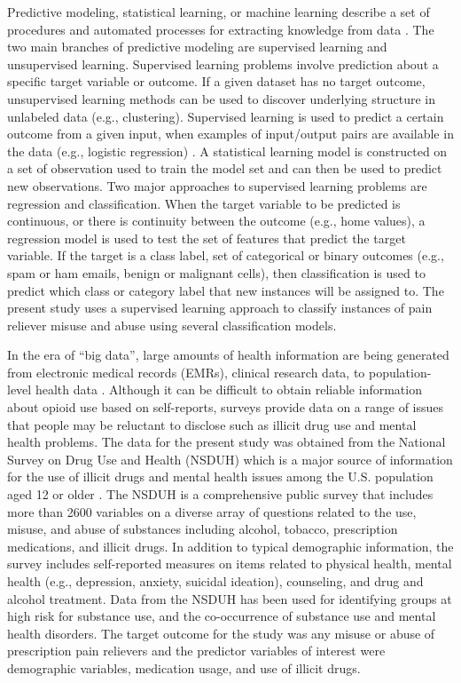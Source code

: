 \documentclass[sigconf]{acmart}
\begin{document}
Predictive modeling, statistical learning, or machine learning describe a 
set of procedures and automated processes for extracting knowledge from data 
\cite{james13, kuhn13, muller17, raschka17}. The two main branches of 
predictive modeling are supervised learning and unsupervised learning. 
Supervised learning problems involve prediction about a specific target 
variable or outcome. If a given dataset has no target outcome, unsupervised 
learning methods can be used to discover underlying structure in unlabeled data 
(e.g., clustering). Supervised learning is used to predict a certain outcome 
from a given input, when examples of input/output pairs are available in the 
data (e.g., logistic regression) \cite{muller17}. A statistical learning model 
is constructed on a set of observation used to train the model set and can then 
be used to predict new observations. Two major approaches to supervised learning 
problems are regression and classification. When the target variable to be 
predicted is continuous, or there is continuity between the outcome 
(e.g., home values), a regression model is used to test the set of features 
that predict the target variable. If the target is a class label, set of 
categorical or binary outcomes (e.g., spam or ham emails, benign or malignant 
cells), then classification is used to predict which class or category label 
that new instances will be assigned to. The present study uses a supervised 
learning approach to classify instances of pain reliever misuse and abuse 
using several classification models. 


In the era of ``big data'', large amounts of health information are being 
generated from electronic medical records (EMRs), clinical research data, to 
population-level health data \cite{herland14}. Although it can be difficult 
to obtain reliable information about opioid use based on self-reports, surveys 
provide data on a range of issues that people may be reluctant to disclose 
such as illicit drug use and mental health problems. The data for the present 
study was obtained from the National Survey on Drug Use and Health (NSDUH) 
which is a major source of information for the use of illicit drugs and mental 
health issues among the U.S. population aged 12 or older \cite{samhsa18}. 
The NSDUH is a comprehensive public survey that includes more than 2600 
variables on a diverse array of questions related to the use, misuse, and 
abuse of substances including alcohol, tobacco, prescription medications, and 
illicit drugs. In addition to typical demographic information, the survey
includes self-reported measures on items related to physical health, mental 
health (e.g., depression, anxiety, suicidal ideation), counseling, and drug 
and alcohol treatment. Data from the NSDUH has been used for identifying 
groups at high risk for substance use, and the co-occurrence of substance 
use and mental health disorders. The target outcome for the study was any 
misuse or abuse of prescription pain relievers and the predictor variables of 
interest were demographic variables, medication usage, and use of illicit drugs. 
\end{document}

